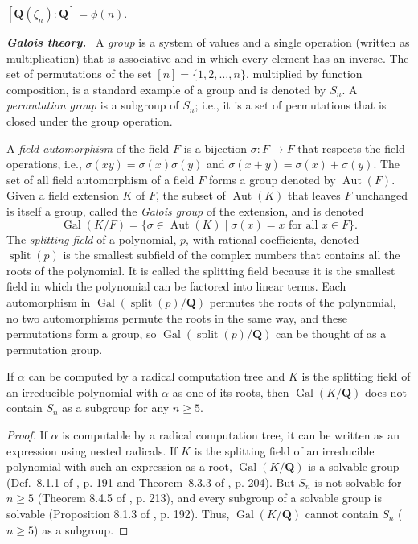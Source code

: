 \documentclass[oribibl,10pt]{llncs}
\newcommand{\rationals}{\mathbf{Q}}
\newcommand{\Emph}[1]{\smallskip\textbf{\textit{#1}}~}
\DeclareMathOperator{\Gal}{Gal}
\DeclareMathOperator{\Aut}{Aut}
\DeclareMathOperator{\splitting}{split}
\begin{document}
\begin{lemma}
\label{lem:roots-of-unity}
$[\rationals(\zeta_n):\rationals] = \phi(n)$.
\end{lemma}

\Emph{Galois theory.}
A \emph{group} is a system of values and a single operation (written as multiplication) that is associative and in which every element has an inverse. The set of permutations of the set $[n] = \{1,2,\ldots,n\}$, multiplied by function composition, is a standard example of a group and is denoted by $S_n$. A \emph{permutation group} is a subgroup of $S_n$; i.e., it is a set of permutations that is closed under the group operation.

A \emph{field automorphism} of the field $F$ is a bijection $\sigma :F \to F$ that respects the field operations, i.e., $\sigma(xy) = \sigma(x)\sigma(y)$ and $\sigma(x+y) = \sigma(x) + \sigma(y)$. The set of all field automorphism of a field $F$ forms a group denoted by $\Aut(F)$. Given a field extension $K$ of $F$, the subset of $\Aut(K)$ that leaves $F$ unchanged is itself a group, called the \emph{Galois group} of the extension, and is denoted
\[
\Gal(K/F) = \{\sigma \in \Aut(K) \mid \sigma(x) = x \text{ for all } x \in F \}.
\]
The \emph{splitting field} of a polynomial, $p$, with rational coefficients, denoted $\splitting (p)$ is the smallest subfield of the complex numbers that contains  all the roots of the polynomial. 
\ifFull
It is called the splitting field because it is the smallest field in which the polynomial can be factored into linear terms.
\fi
Each automorphism in $\Gal(\splitting(p)/\rationals)$ permutes the roots of the polynomial, no two automorphisms permute the roots in the same way, and these permutations form a group, so $\Gal(\splitting(p)/\rationals)$ can be thought of as a permutation group.

\begin{lemma}\label{lem:radical-tree}
If $\alpha$ can be computed by a radical computation tree and $K$ is the splitting field of an irreducible polynomial with $\alpha$ as one of its roots, then $\Gal(K/\rationals)$ does not contain $S_n$ as a subgroup for any $n \geq 5$.
\end{lemma}
\begin{proof}
If $\alpha$ is computable by a radical computation tree, it can be written as an expression using nested radicals. If $K$ is the splitting field of an irreducible polynomial with such an expression as a root, $\Gal(K/\rationals)$ is a solvable group (Def.~8.1.1 of \cite{Cox2012}, p. 191 and Theorem~8.3.3 of \cite{Cox2012}, p. 204). But $S_n$ is not solvable for $n \geq 5$ (Theorem 8.4.5 of \cite{Cox2012}, p. 213), and every subgroup of a solvable group is solvable (Proposition 8.1.3 of \cite{Cox2012}, p. 192). Thus, $\Gal(K/\rationals)$ cannot contain $S_n$ ($n\ge 5$) as a subgroup.\end{proof}
\end{document}

